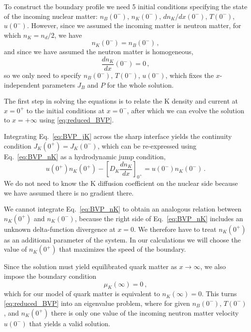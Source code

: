 \documentclass[10pt,superscriptaddress,
amsmath,aps,prc,twocolumn,nofootinbib,floatfix]{revtex4-1}
\newcommand{\mga}[1]{{\color[rgb]{0.6,0,0}#1}}
\begin{document}
To construct the boundary profile we need 5 initial conditions  specifying the state of the incoming nuclear matter: $n_B(0^-)$, $n_K(0^-)$, $dn_K/dx(0^-)$, $T(0^-)$, $u(0^-)$.
However, since we assumed the incoming matter is  neutron matter, for which $n_K=n_d/2$, we have
\begin{equation}
  n_K(0^-)=n_B(0^-)\,,
  \label{eq:nK-nuclear}
\end{equation}
and since we have assumed the neutron matter is homogeneous,
\begin{equation}
  \dfrac{dn_K}{dx}(0^-)=0\,,
  \label{eq:dnKdx-nuclear}
\end{equation}
so we only need to specify $n_B(0^-)$,  $T(0^-)$, $u(0^-)$, which fixes the $x$-independent parameters $J_B$ and $P$ for the whole solution.

The first step in solving the equations is to relate the K density and current at $x=0^+$ to the initial conditions at $x=0^-$, after which we can evolve the solution to $x=+\infty$ using \eqref{eq:reduced_BVP}.

Integrating Eq.~\eqref{eq:BVP_jK} 
across the sharp interface yields the continuity condition $J_K(0^+)=J_K(0^-)$, which can be re-expressed using Eq.~\eqref{eq:BVP_nK} as a
hydrodynamic jump condition,
\begin{equation}
 u(0^+)n_K(0^+)
 -\left[D_K\frac{dn_K}{dx}\right]_{0^+}
 =u(0^-)n_K(0^-)\,.
\label{eq:jump_K-}
\end{equation}
We do not need to know the K diffusion coefficient on the nuclear side because we have assumed there is no gradient there. 

We cannot integrate Eq.~\eqref{eq:BVP_nK} to obtain an analogous relation between $n_K(0^+)$ and $n_K(0^-)$, because \mga{the right side of Eq.~\eqref{eq:BVP_nK} includes an unknown delta-function divergence at $x=0$.}
We therefore have to treat $n_K(0^+)$ as an additional parameter of the system.
In our calculations we will choose the value of $n_K(0^+)$ that maximizes the speed of the boundary.

Since the solution must yield equilibrated quark matter as $x\to\infty$, we also impose the boundary condition 
\begin{equation}
    \mu_K(\infty)=0 \ ,
\end{equation}
which for our model of quark matter is equivalent to $n_K(\infty)=0$.
This turns \eqref{eq:reduced_BVP} into an eigenvalue problem, where for given $n_B(0^-)$, $T(0^-)$, and $n_K(0^+)$ there is only one value of the incoming neutron matter velocity $u(0^-)$ that yields a valid solution.
\end{document}
